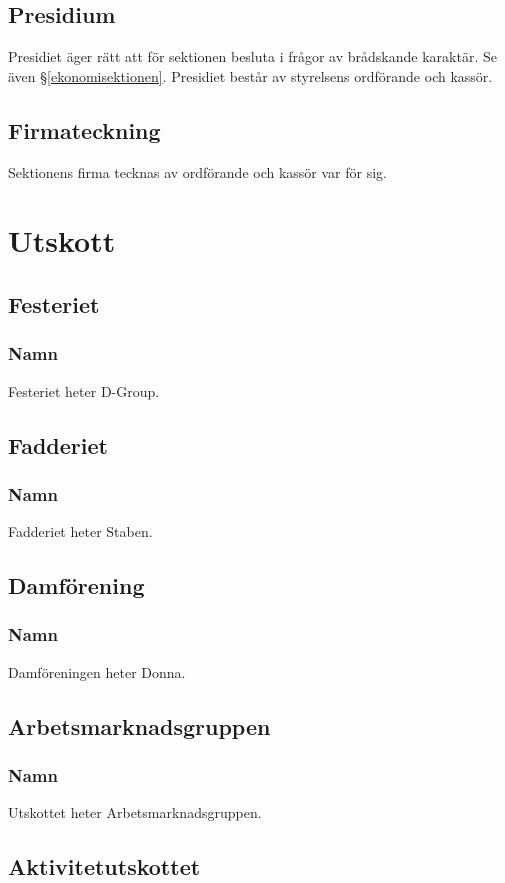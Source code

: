 \documentclass{datateknologsektionen-document}
\begin{document}
    \subsection{Presidium}
      Presidiet äger rätt att för sektionen besluta i frågor av brådskande karaktär. Se även
      \S \ref{ekonomisektionen}. Presidiet består av styrelsens ordförande och kassör.
    \subsection{Firmateckning}
      Sektionens firma tecknas av ordförande och kassör var för sig.
  
  \section{Utskott}
    \subsection{Festeriet}
      \subsubsection{Namn}
        Festeriet heter D-Group.
    \subsection{Fadderiet}
      \subsubsection{Namn}
        Fadderiet heter Staben.
    \subsection{Damförening}
      \subsubsection{Namn}
        Damföreningen heter Donna.
    \subsection{Arbetsmarknadsgruppen}
      \subsubsection{Namn}
        Utskottet heter Arbetsmarknadsgruppen.
    \subsection{Aktivitetutskottet}
\end{document}
